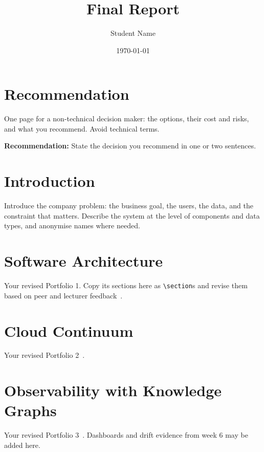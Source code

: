 \documentclass[report]{itvest}
\title{Final Report}
\author{Student Name} %
\date{\today}
\begin{document}
\maketitle

\tableofcontents

\chapter{Recommendation}

One page for a non-technical decision maker: the options, their cost and
risks, and what you recommend. Avoid technical terms.

\begin{checkit}
  \textbf{Recommendation:} State the decision you recommend in one or two
  sentences.
\end{checkit}

\chapter{Introduction}

Introduce the company problem: the business goal, the users, the data, and
the constraint that matters. Describe the system at the level of
components and data types, and anonymise names where needed.

\chapter{Software Architecture}

Your revised Portfolio 1. Copy its sections here as \verb|\section|s and
revise them based on peer and lecturer feedback~\cite{bass_software_2021}.

\chapter{Cloud Continuum}

Your revised Portfolio 2~\cite{bass_engineering_2025}.

\chapter{Observability with Knowledge Graphs}

Your revised Portfolio 3~\cite{huyen_designing_2022}. Dashboards and
drift evidence from week 6 may be added here.
\end{document}
